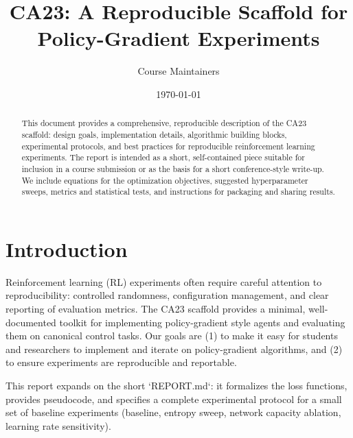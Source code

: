 \documentclass[11pt]{article}
\title{CA23: A Reproducible Scaffold for Policy-Gradient Experiments}
\author{Course Maintainers}
\date{\today}
\begin{document}
\maketitle

\begin{abstract}
This document provides a comprehensive, reproducible description of the CA23
scaffold: design goals, implementation details, algorithmic building blocks,
experimental protocols, and best practices for reproducible reinforcement
learning experiments. The report is intended as a short, self-contained piece
suitable for inclusion in a course submission or as the basis for a short
conference-style write-up. We include equations for the optimization
objectives, suggested hyperparameter sweeps, metrics and statistical tests,
and instructions for packaging and sharing results.
\end{abstract}

\section{Introduction}
Reinforcement learning (RL) experiments often require careful attention to
reproducibility: controlled randomness, configuration management, and clear
reporting of evaluation metrics. The CA23 scaffold provides a minimal,
well-documented toolkit for implementing policy-gradient style agents and
evaluating them on canonical control tasks. Our goals are (1) to make it easy
for students and researchers to implement and iterate on policy-gradient
algorithms, and (2) to ensure experiments are reproducible and reportable.

This report expands on the short `REPORT.md`: it formalizes the loss
functions, provides pseudocode, and specifies a complete experimental protocol
for a small set of baseline experiments (baseline, entropy sweep, network
capacity ablation, learning rate sensitivity).
\end{document}
